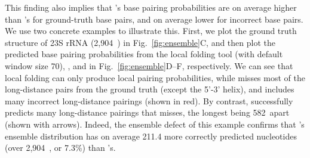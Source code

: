 This finding also implies that  \linearpartition's  base pairing probabilities 
are on average higher than \rnafold's for ground-truth base pairs,
and on average lower for incorrect base pairs.
We use two concrete examples to illustrate this.
First, we plot the ground truth structure of \ecoli 23S rRNA (2,904~\nts) in
Fig.~\ref{fig:ensemble}C,
and then plot the predicted base pairing probabilities
from the local folding tool \viennarnaplfold (with default window size 70), \rnafold, and \linearpartition
in Fig.~\ref{fig:ensemble}D--F, respectively.
We can see that local folding can only produce local pairing probabilities,
while \rnafold misses
most of the long-distance pairs from the ground truth (except the 5'-3' helix),
and includes many incorrect long-distance pairings (shown in red).
By contrast, \linearpartition successfully predicts many
long-distance pairings that \rnafold misses, the longest being 582~\nts apart (shown with arrows).
Indeed, the ensemble defect of this example confirms that \linearpartition's ensemble distribution
has on average 211.4 more correctly predicted nucleotides (over 2,904~\nts, or 7.3\%) than \rnafold's.

